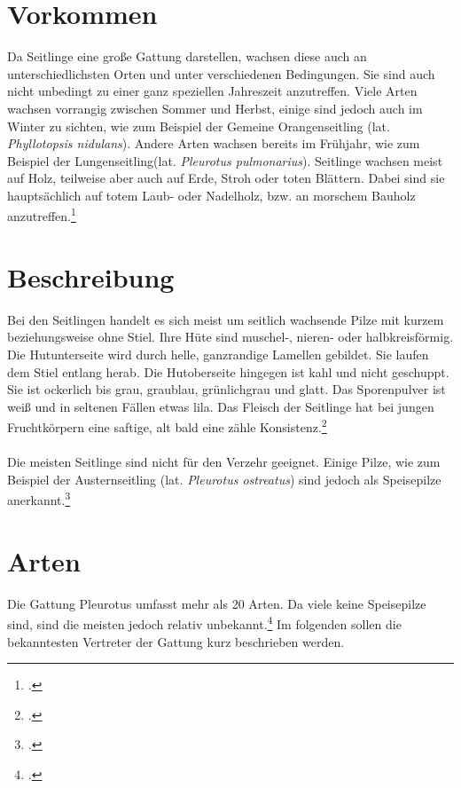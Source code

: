 \documentclass[a4paper,abstracton]{scrreprt}
\begin{document}
\section{Vorkommen}
Da Seitlinge eine große Gattung darstellen, wachsen diese auch an unterschiedlichsten Orten und unter verschiedenen Bedingungen. Sie sind auch nicht unbedingt zu einer ganz speziellen Jahreszeit anzutreffen. Viele Arten wachsen vorrangig zwischen Sommer und Herbst, einige sind jedoch auch im Winter zu sichten, wie zum Beispiel der Gemeine Orangenseitling (lat. \emph{Phyllotopsis nidulans}). Andere Arten wachsen bereits im Frühjahr, wie zum Beispiel der Lungenseitling(lat. \emph{Pleurotus pulmonarius}). Seitlinge wachsen meist auf Holz, teilweise aber auch auf Erde, Stroh oder toten Blättern. Dabei sind sie hauptsächlich auf totem Laub- oder Nadelholz, bzw. an morschem Bauholz anzutreffen.\footcite{pilzech}

\section{Beschreibung}
Bei den Seitlingen handelt es sich meist um seitlich wachsende Pilze mit kurzem beziehungsweise ohne Stiel. Ihre Hüte sind muschel-, nieren- oder halbkreisförmig. Die Hutunterseite wird durch helle, ganzrandige Lamellen gebildet. Sie laufen dem Stiel entlang herab. Die Hutoberseite hingegen ist kahl und nicht geschuppt. Sie ist ockerlich bis grau, graublau, grünlichgrau und glatt. Das Sporenpulver ist weiß und in seltenen Fällen etwas lila. Das Fleisch der Seitlinge hat bei jungen Fruchtkörpern eine saftige, alt bald eine zähle Konsistenz.\footcite{pilzech}\\
\\Die meisten Seitlinge sind nicht für den Verzehr geeignet. Einige Pilze, wie zum Beispiel der Austernseitling (lat. \emph{Pleurotus ostreatus}) sind jedoch als Speisepilze anerkannt.\footcite{pg_austernseitling}

\section{Arten}
Die Gattung Pleurotus umfasst mehr als 20 Arten. Da viele keine Speisepilze sind, sind die meisten jedoch relativ unbekannt.\footcite{pilzech} Im folgenden sollen die bekanntesten Vertreter der Gattung kurz beschrieben werden.
\end{document}
